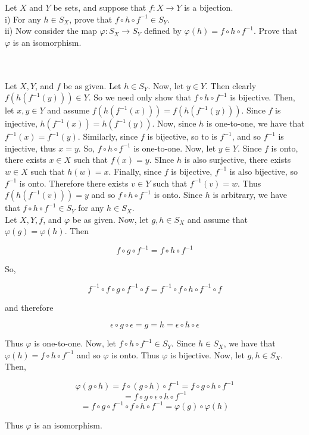 Let $X$ and $Y$ be sets, and suppose that $f:X\rightarrow Y$ is a bijection.\\

i) For any $h\in S_X$, prove that $f\circ h\circ f^{-1}\in S_Y$.\\

ii) Now consider the map $\varphi:S_X\rightarrow S_Y$ defined by $\varphi(h)=f\circ h\circ f^{-1}$.
Prove that $\varphi$ is an isomorphism.\\\\

\begin{solution}\renewcommand{\qedsymbol}{}\ \\
    Let $X, Y$, and $f$ be as given. Let $h\in S_Y$. Now, let $y\in Y$. Then clearly
    $f(h(f^{-1}(y)))\in Y$. So we need only show that $f\circ h\circ f^{-1}$ is bijective. Then, let
    $x,y\in Y$ and assume $f(h(f^{-1}(x)))=f(h(f^{-1}(y)))$. Since $f$ is injective,
    $h(f^{-1}(x))=h(f^{-1}(y))$. Now, since $h$ is one-to-one, we have that $f^{-1}(x)=f^{-1}(y)$.
    Similarly, since $f$ is bijective, so to is $f^{-1}$, and so $f^{-1}$ is injective, thus $x=y$. So,
    $f\circ h\circ f^{-1}$ is one-to-one. Now, let $y\in Y$. Since $f$ is onto, there exists $x\in X$
    such that $f(x)=y$. SInce $h$ is also surjective, there exists $w\in X$ such that $h(w)=x$. Finally,
    since $f$ is bijective, $f^{-1}$ is also bijective, so $f^{-1}$ is onto. Therefore there exists
    $v\in Y$ such that $f^{-1}(v)=w$. Thus $f(h(f^{-1}(v)))=y$ and so $f\circ h\circ f^{-1}$ is onto.
    Since $h$ is arbitrary, we have that $f\circ h\circ f^{-1}\in S_Y$ for any $h\in S_X$.\\

    Let $X, Y, f$, and $\varphi$ be as given. Now, let $g,h\in S_X$ and assume that
    $\varphi(g)=\varphi(h)$. Then
    
    $$f\circ g\circ f^{-1}=f\circ h\circ f^{-1}$$
    
    So,
    
    $$f^{-1}\circ f\circ g\circ f^{-1}\circ f=f^{-1}\circ f\circ h\circ f^{-1}\circ f$$
    
    and therefore
    
    $$\epsilon\circ g\circ\epsilon=g=h=\epsilon\circ h\circ\epsilon$$
    
    Thus $\varphi$ is one-to-one. Now, let $f\circ h\circ f^{-1}\in S_Y$. Since $h\in S_X$, we have that
    $\varphi(h)=f\circ h\circ f^{-1}$ and so $\varphi$ is onto. Thus $\varphi$ is bijective. Now, let
    $g,h\in S_X$. Then,
    
    $$\varphi(g\circ h)=f\circ (g\circ h)\circ f^{-1}=f\circ g\circ h\circ f^{-1}$$
    $$=f\circ g\circ\epsilon\circ h\circ f^{-1}$$
    $$=f\circ g\circ f^{-1}\circ f\circ h\circ f^{-1}=\varphi(g)\circ\varphi(h)$$
    
    Thus $\varphi$ is an isomorphism.

\end{solution}